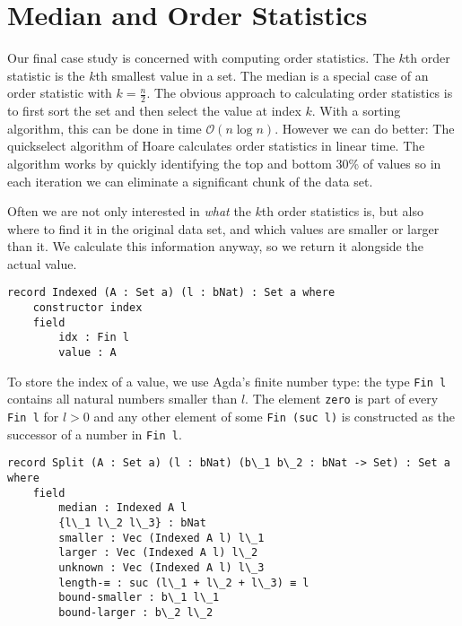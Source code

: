 
\section{Median and Order Statistics}
Our final case study is concerned with computing order statistics. The $k$th order statistic is the $k$th smallest value in a set. The median is a special case of an order statistic with $k = \frac n 2$. The obvious approach to calculating order statistics is to first sort the set and then select the value at index $k$. With a sorting algorithm, this can be done in time $\mathcal O(n \log n)$. However we can do better: The quickselect algorithm of Hoare \cite{hoare:1961:quickselect} calculates order statistics in linear time. The algorithm works by quickly identifying the top and bottom 30\% of values so in each iteration we can eliminate a significant chunk of the data set.

Often we are not only interested in \emph{what} the $k$th order statistics is, but also where to find it in the original data set, and which values are smaller or larger than it. We calculate this information anyway, so we return it alongside the actual value.

\begin{lstlisting}[caption={The Indexed Type},label={lst:median:indexed},emph={Indexed,index}]
record Indexed (A : Set a) (l : bNat) : Set a where
    constructor index
    field
        idx : Fin l
        value : A
\end{lstlisting}

To store the index of a value, we use Agda's finite number type: the type \texttt{Fin l} contains all natural numbers smaller than $l$. The element \texttt{zero} is part of every \texttt{Fin l}  for $l > 0$ and any other element of some \texttt{Fin (suc l)} is constructed as the successor of a number in \texttt{Fin l}.

\begin{lstlisting}[caption={The Split Type},label={lst:median:split},emph={Split,Indexed}]
record Split (A : Set a) (l : bNat) (b\_1 b\_2 : bNat -> Set) : Set a where
    field
        median : Indexed A l
        {l\_1 l\_2 l\_3} : bNat
        smaller : Vec (Indexed A l) l\_1
        larger : Vec (Indexed A l) l\_2
        unknown : Vec (Indexed A l) l\_3
        length-≡ : suc (l\_1 + l\_2 + l\_3) ≡ l
        bound-smaller : b\_1 l\_1
        bound-larger : b\_2 l\_2
\end{lstlisting}

